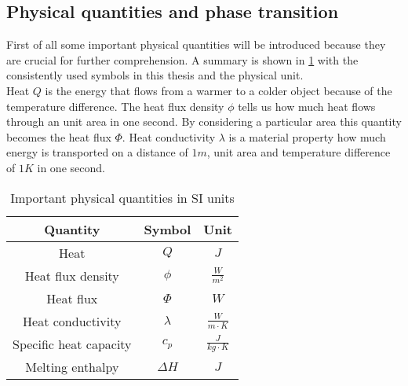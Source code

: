 \documentclass{scrartcl}[12pt, halfparskip]
\numberwithin{equation}{section}
\numberwithin{figure}{section}
\numberwithin{table}{section}
\begin{document}
\subsection{Physical quantities and phase transition}

First of all some important physical quantities will be introduced because they are crucial for further comprehension. A summary is shown in \cref{tab:important_physical_quantities} with the consistently used symbols in this thesis and the physical unit. \\
Heat $Q$ is the energy that flows from a warmer to a colder object because of the temperature difference. The heat flux density $\phi$ tells us how much heat flows through an unit area in one second. By considering a particular area this quantity becomes the heat flux $\varPhi$. Heat conductivity $\lambda$ is a material property how much energy is transported on a distance of $1m$, unit area and temperature difference of $1K$ in one second.

\begin{table}
	\centering
	\caption{Important physical quantities in SI units}
	\begin{tabular}{| c | c | c |} \hline
		Quantity & Symbol & Unit \\ \hline
		Heat & $Q$ & $J$ \\[0.7ex]
		Heat flux density & $\phi$ & $\frac{W}{m^2}$ \\[0.7ex]
		Heat flux & $\varPhi$ & $W$ \\[0.7ex]
		Heat conductivity & $\lambda$ & $\frac{W}{m \cdot K}$ \\[0.7ex]
		Specific heat capacity & $c_p$ & $\frac{J}{kg \cdot K}$ \\[0.7ex]
		Melting enthalpy & $\Delta H$ & $J$ \\ \hline
	\end{tabular}
\label{tab:important_physical_quantities}
\end{table}
\end{document}
